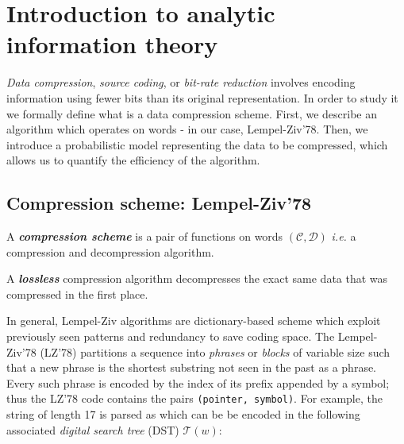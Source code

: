 \section{Introduction to analytic information theory}

\emph{Data compression}, \emph{source coding}, or 
\emph{bit-rate reduction} involves encoding 
information using fewer bits than its original
representation.
In order to study it we formally define what is 
a data compression scheme. 
First, we describe an algorithm which operates on words - 
in our case, Lempel-Ziv'78.
Then, we introduce a probabilistic model representing
the data to be compressed, which allows us to quantify
the efficiency of the algorithm.


\subsection{Compression scheme: Lempel-Ziv'78 }

\begin{definition}
    A \emph{\bfseries compression scheme} is a pair of functions on
    words $(\mathcal{C}, \mathcal{D})$ \textit{i.e.} a compression 
    and decompression algorithm.
\end{definition}

\begin{definition}
    \label{def:lossless}
    A \emph{\bfseries lossless} compression algorithm decompresses 
    the exact same data that was compressed in the first place.
\end{definition}


\noindent
In general, Lempel-Ziv algorithms are dictionary-based scheme
which exploit previously seen patterns and redundancy to 
save coding space. 
The Lempel-Ziv'78 (LZ'78) partitions a sequence into 
\emph{phrases} or \emph{blocks} of variable size such that a new phrase
is the shortest substring not seen in the past as a phrase. 
Every such phrase is encoded by the index of its prefix 
appended by a symbol; thus the LZ'78 code contains the 
pairs \verb|(pointer, symbol)|. 
For example, the string 
\noindent of length 17 is parsed
as 
\noindent
which can be be 
encoded in the following associated \emph{digital search tree} (DST) $\mathcal{T}(w)$:

